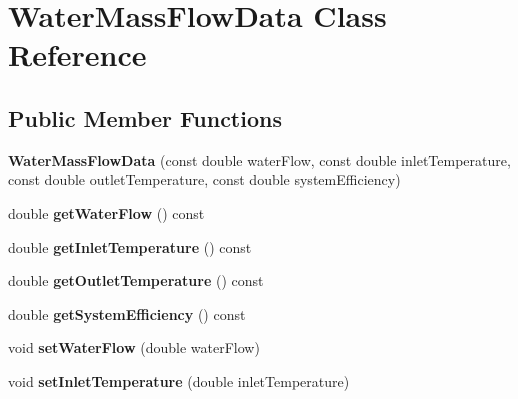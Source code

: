 \hypertarget{class_water_mass_flow_data}{}\section{Water\+Mass\+Flow\+Data Class Reference}
\label{class_water_mass_flow_data}
\subsection*{Public Member Functions}
\begin{DoxyCompactItemize}
\item 
\mbox{\label{class_water_mass_flow_data_a7224fde8b1fa5ad72b33795a2c2fb032}} 
{\bfseries Water\+Mass\+Flow\+Data} (const double water\+Flow, const double inlet\+Temperature, const double outlet\+Temperature, const double system\+Efficiency)
\item 
\mbox{\label{class_water_mass_flow_data_adec24638b0b661c67c2078cf7baa1113}} 
double {\bfseries get\+Water\+Flow} () const
\item 
\mbox{\label{class_water_mass_flow_data_a1b5b0531d88499b941a7347bd448ddd3}} 
double {\bfseries get\+Inlet\+Temperature} () const
\item 
\mbox{\label{class_water_mass_flow_data_a58591a852d7d7ab0078294e87b8404ef}} 
double {\bfseries get\+Outlet\+Temperature} () const
\item 
\mbox{\label{class_water_mass_flow_data_a7381a249fbb481b9cd0ba5f6874e465e}} 
double {\bfseries get\+System\+Efficiency} () const
\item 
\mbox{\label{class_water_mass_flow_data_a996ab40468abb603ab06cf5cd604e12e}} 
void {\bfseries set\+Water\+Flow} (double water\+Flow)
\item 
\mbox{\label{class_water_mass_flow_data_a611f30a017ca72900d37b67ad4ce770a}} 
void {\bfseries set\+Inlet\+Temperature} (double inlet\+Temperature)
\item 
\mbox{\label{class_water_mass_flow_data_a5dbf48f498de988696075c313e2b0cbb}} 

\end{DoxyCompactItemize}
